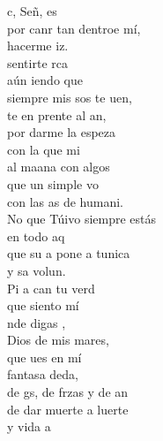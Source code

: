 \begin{cancion}%
	c, Señ,  es \\
	por canr tan dentroe mí,\\
	 hacerme iz.\\
	 sentirte rca\\
	aún iendo que\\
	siempre mis sos te uen,\\
	te en prente al an,\\
	por darme la espeza   \\
	con la que mi  \\
	al maana con algos\\
	que un simple vo \\
	con las as de humani.\\
	No que Túivo siempre estás\\
	en todo aq \\
	que su a pone a tunica\\
	y sa volun.\\
	\jump
	Pi a can tu verd\\
	que siento  mí\\
	nde digas , \\
	Dios de mis mares,\\
	que ues en mí\\
	 fantasa deda,\\
	de gs, de frzas y de an\\
	de dar muerte a luerte  \\
	y vida a \\

\end{cancion}
